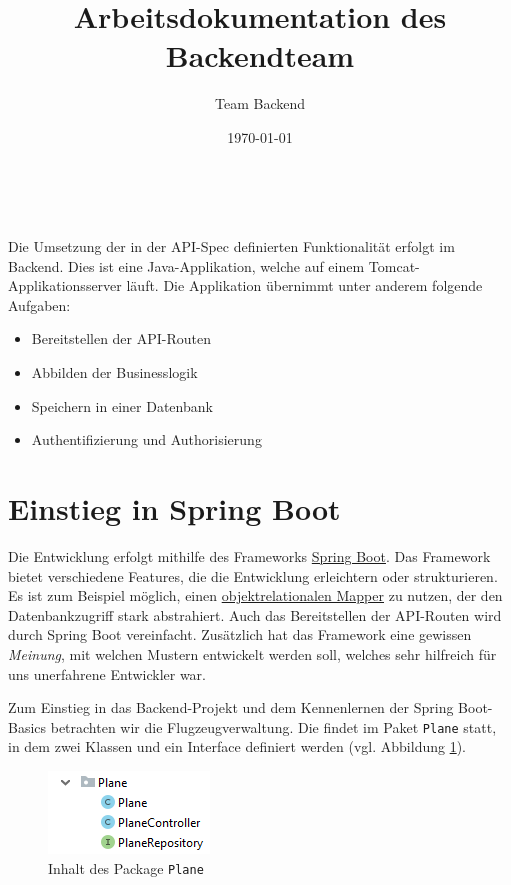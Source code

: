 \documentclass[a4paper, 11pt]{article}
\title{\textbf{Arbeitsdokumentation des Backendteam}}
\author{Team Backend}
\date{\today} %
\makeatletter
\renewcommand{\maketitle}{ %
\begin{flushright} %
{\LARGE\@title} %

\vspace{10pt} %

{\large\@author} %
\\\@date %

\vspace{20pt} %
\end{flushright}
}
\providecommand{\tightlist}{%
  \setlength{\itemsep}{0pt}\setlength{\parskip}{0pt}}
\makeatother
\begin{document}
\renewcommand{\@listI}{\itemsep=0pt} %

\maketitle %

Die Umsetzung der in der API-Spec definierten Funktionalität erfolgt im
Backend. Dies ist eine Java-Applikation, welche auf einem
Tomcat-Appli\-ka\-tions\-server läuft. Die Applikation übernimmt unter anderem
folgende Aufgaben:

\begin{itemize}
    \tightlist
    \item Bereitstellen der API-Routen
    \item Abbilden der Businesslogik
    \item Speichern in einer Datenbank
    \item Authentifizierung und Authorisierung
\end{itemize}

\section{Einstieg in Spring Boot}

Die Entwicklung erfolgt mithilfe des Frameworks
\href{https://en.wikipedia.org/wiki/Spring_Boot#Spring_Boot}{Spring Boot}. Das
Framework bietet verschiedene Features, die die Entwicklung erleichtern oder
strukturieren. Es ist zum Beispiel möglich, einen
\href{https://de.wikipedia.org/wiki/Objektrelationale_Abbildung}{objektrelationalen
Mapper}
zu nutzen, der den Datenbankzugriff stark abstrahiert. Auch das Bereitstellen
der API-Routen wird durch Spring Boot vereinfacht. Zusätzlich hat das
Framework eine gewissen \emph{Meinung}, mit welchen Mustern entwickelt werden
soll, welches sehr hilfreich für uns unerfahrene Entwickler war.

Zum Einstieg in das Backend-Projekt und dem Kennenlernen der Spring Boot-Basics
betrachten wir die Flugzeugverwaltung. Die findet im Paket \lstinline{Plane}
statt, in dem zwei Klassen und ein Interface definiert werden (vgl. Abbildung
\ref{fig:planes_package}).

\begin{figure}[htpb]
    \centering
    \includegraphics{images/plane_package.png}
    \caption{Inhalt des Package \lstinline{Plane}}
    \label{fig:planes_package}
\end{figure}
\end{document}
